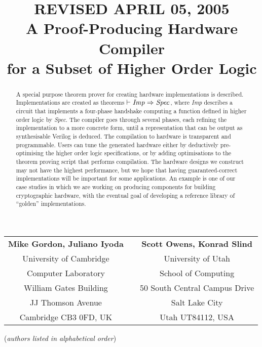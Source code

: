 \documentclass{llncs}
\title{{\tiny REVISED APRIL 05, 2005}\\
       A Proof-Producing Hardware Compiler\\
       for a Subset of Higher Order Logic}
\author{}
\institute{}
\begin{document}
\maketitle

\vspace*{-8mm}

\begin{center}
\begin{tabular}{ccc}
{\bf Mike Gordon, Juliano Iyoda} &\hspace*{5mm}& {\bf Scott Owens, Konrad Slind}\\
University of Cambridge          &\hspace*{5mm}& University of Utah\\
Computer Laboratory              &\hspace*{5mm}& School of Computing\\
William Gates Building           &\hspace*{5mm}& 50 South Central Campus Drive\\
JJ Thomson Avenue                &\hspace*{5mm}& Salt Lake City\\
Cambridge CB3 0FD, UK            &\hspace*{5mm}& Utah UT84112, USA
\end{tabular}


\vspace*{2mm}

({\it{authors listed in alphabetical order\/}})
\end{center}

\vspace*{-5mm}

\thispagestyle{empty}

\begin{abstract}
A special purpose theorem prover for creating hardware implementations
is described.  Implementations are created as theorems $\vdash
{\it{Imp}}\Rightarrow{\it{Spec}}$, where {\it{Imp}} describes a
circuit that implements a four-phase handshake computing a function
defined in higher order logic by {\it{Spec}}.  The compiler goes
through several phases, each refining the implementation to a more
concrete form, until a representation that can be output as
synthesisable Verilog is deduced.  The compilation to hardware is
transparent and programmable. Users can tune the generated hardware
either by deductively pre-optimising the higher order logic
specifications, or by adding optimisations to the theorem proving
script that performs compilation.  The hardware designs we construct
may not have the highest performance, but we hope that having
guaranteed-correct implementations will be important for some applications.
An example is one of our case studies in which we are working on
producing components for building cryptographic hardware, with
the eventual goal of developing a reference library of ``golden''
implementations.


\end{abstract}
\end{document}
